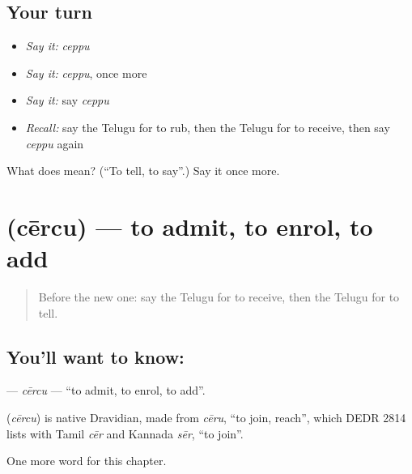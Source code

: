 \subsection*{Your turn}
\begin{itemize}
\raggedright
  \item \emph{Say it:} \emph{ceppu}
  \item \emph{Say it:} \emph{ceppu}, once more
  \item \emph{Say it:} say \emph{ceppu}
  \item \emph{Recall:} say the Telugu for to rub, then the Telugu for to receive, then say \emph{ceppu} again
\end{itemize}

\begin{tcolorbox}[breakable,colback=teal!4,colframe=teal!35!black,title={Before you move on}]
What does  mean? (\textquotedblleft{}To tell, to say\textquotedblright{}.) Say it once more.
\end{tcolorbox}
\section[\texorpdfstring{\te{చేర్చు} (cērcu)}{చేర్చు (cērcu)}]{ (cērcu) — to admit, to enrol, to add}

\label{lesson:TE-C280-cercu}



\begin{quote}
Before the new one: say the Telugu for to receive, then the Telugu for to tell.
\end{quote}

\subsection*{You'll want to know: }
\textbf{} — \emph{cērcu} — \textquotedblleft{}to admit, to enrol, to add\textquotedblright{}.

\begin{cousinweb}
\textbf{} (\emph{cērcu}) is native Dravidian, made from \emph{cēru}, \textquotedblleft{}to join, reach\textquotedblright{}, which DEDR 2814 lists with Tamil \emph{cēr} and Kannada \emph{sēr}, \textquotedblleft{}to join\textquotedblright{}.
\end{cousinweb}

\begin{grammarlens}[title={What you've built}]
One more word for this chapter.
\end{grammarlens}

